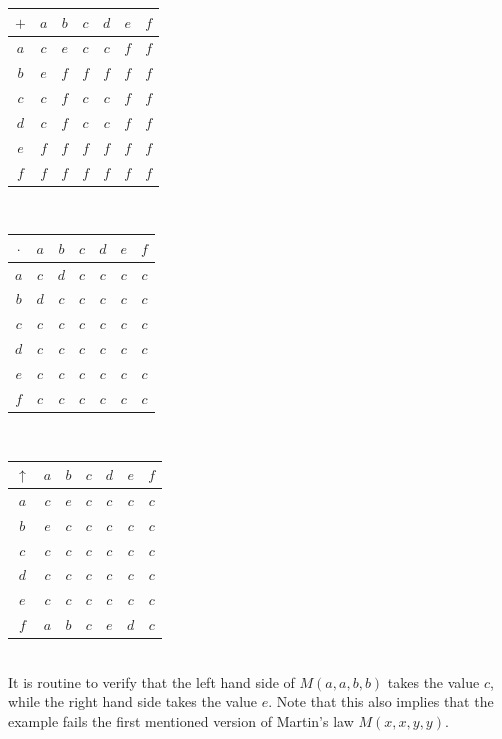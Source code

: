 \documentclass[eqnor,reqno]{amsart}
\theoremstyle{plain}
\theoremstyle{definition}
\begin{document}
\noindent \begin{tabular}{c|cccccc}
$+$&$a$&$b$&$c$&$d$&$e$&$f$\\
\hline
$a$&$c$&$e$&$c$&$c$&$f$&$f$\\
$b$&$e$&$f$&$f$&$f$&$f$&$f$\\
$c$&$c$&$f$&$c$&$c$&$f$&$f$\\
$d$&$c$&$f$&$c$&$c$&$f$&$f$\\
$e$&$f$&$f$&$f$&$f$&$f$&$f$\\
$f$&$f$&$f$&$f$&$f$&$f$&$f$\\
\end{tabular}\ \
\begin{tabular}{c|cccccc}
$\cdot$&$a$&$b$&$c$&$d$&$e$&$f$\\
\hline
$a$&$c$&$d$&$c$&$c$&$c$&$c$\\
$b$&$d$&$c$&$c$&$c$&$c$&$c$\\
$c$&$c$&$c$&$c$&$c$&$c$&$c$\\
$d$&$c$&$c$&$c$&$c$&$c$&$c$\\
$e$&$c$&$c$&$c$&$c$&$c$&$c$\\
$f$&$c$&$c$&$c$&$c$&$c$&$c$\\
\end{tabular}\ \
\begin{tabular}{c|cccccc}
$\uparrow$&$a$&$b$&$c$&$d$&$e$&$f$\\
\hline
$a$&$c$&$e$&$c$&$c$&$c$&$c$\\
$b$&$e$&$c$&$c$&$c$&$c$&$c$\\
$c$&$c$&$c$&$c$&$c$&$c$&$c$\\
$d$&$c$&$c$&$c$&$c$&$c$&$c$\\
$e$&$c$&$c$&$c$&$c$&$c$&$c$\\
$f$&$a$&$b$&$c$&$e$&$d$&$c$\\
\end{tabular}\\
It is routine to verify that the left hand side of $M(a,a,b,b)$ takes the value $c$, while the right hand side takes the value $e$.  Note that this also implies that the example fails the first mentioned version of Martin's  law $M(x,x,y,y)$.
\end{document}
